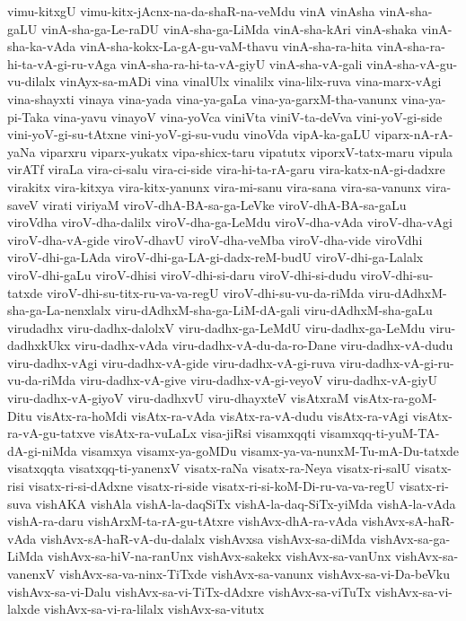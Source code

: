 {vimu-kitxgU
vimu-kitx-jAcnx-na-da-shaR-na-veMdu
vinA
vinAsha
vinA-sha-gaLU
vinA-sha-ga-Le-raDU
vinA-sha-ga-LiMda
vinA-sha-kAri
vinA-shaka
vinA-sha-ka-vAda
vinA-sha-kokx-La-gA-gu-vaM-thavu
vinA-sha-ra-hita
vinA-sha-ra-hi-ta-vA-gi-ru-vAga
vinA-sha-ra-hi-ta-vA-giyU
vinA-sha-vA-gali
vinA-sha-vA-gu-vu-dilalx
vinAyx-sa-mADi
vina
vinalUlx
vinalilx
vina-lilx-ruva
vina-marx-vAgi
vina-shayxti
vinaya
vina-yada
vina-ya-gaLa
vina-ya-garxM-tha-vanunx
vina-ya-pi-Taka
vina-yavu
vinayoV
vina-yoVca
viniVta
viniV-ta-deVva
vini-yoV-gi-side
vini-yoV-gi-su-tAtxne
vini-yoV-gi-su-vudu
vinoVda
vipA-ka-gaLU
viparx-nA-rA-yaNa
viparxru
viparx-yukatx
vipa-shicx-taru
vipatutx
viporxV-tatx-maru
vipula
virATf
viraLa
vira-ci-salu
vira-ci-side
vira-hi-ta-rA-garu
vira-katx-nA-gi-dadxre
virakitx
vira-kitxya
vira-kitx-yanunx
vira-mi-sanu
vira-sana
vira-sa-vanunx
vira-saveV
virati
viriyaM
viroV-dhA-BA-sa-ga-LeVke
viroV-dhA-BA-sa-gaLu
viroVdha
viroV-dha-dalilx
viroV-dha-ga-LeMdu
viroV-dha-vAda
viroV-dha-vAgi
viroV-dha-vA-gide
viroV-dhavU
viroV-dha-veMba
viroV-dha-vide
viroVdhi
viroV-dhi-ga-LAda
viroV-dhi-ga-LA-gi-dadx-reM-budU
viroV-dhi-ga-Lalalx
viroV-dhi-gaLu
viroV-dhisi
viroV-dhi-si-daru
viroV-dhi-si-dudu
viroV-dhi-su-tatxde
viroV-dhi-su-titx-ru-va-va-regU
viroV-dhi-su-vu-da-riMda
viru-dAdhxM-sha-ga-La-nenxlalx
viru-dAdhxM-sha-ga-LiM-dA-gali
viru-dAdhxM-sha-gaLu
virudadhx
viru-dadhx-dalolxV
viru-dadhx-ga-LeMdU
viru-dadhx-ga-LeMdu
viru-dadhxkUkx
viru-dadhx-vAda
viru-dadhx-vA-du-da-ro-Dane
viru-dadhx-vA-dudu
viru-dadhx-vAgi
viru-dadhx-vA-gide
viru-dadhx-vA-gi-ruva
viru-dadhx-vA-gi-ru-vu-da-riMda
viru-dadhx-vA-give
viru-dadhx-vA-gi-veyoV
viru-dadhx-vA-giyU
viru-dadhx-vA-giyoV
viru-dadhxvU
viru-dhayxteV
visAtxraM
visAtx-ra-goM-Ditu
visAtx-ra-hoMdi
visAtx-ra-vAda
visAtx-ra-vA-dudu
visAtx-ra-vAgi
visAtx-ra-vA-gu-tatxve
visAtx-ra-vuLaLx
visa-jiRsi
visamxqqti
visamxqq-ti-yuM-TA-dA-gi-niMda
visamxya
visamx-ya-goMDu
visamx-ya-va-nunxM-Tu-mA-Du-tatxde
visatxqqta
visatxqq-ti-yanenxV
visatx-raNa
visatx-ra-Neya
visatx-ri-salU
visatx-risi
visatx-ri-si-dAdxne
visatx-ri-side
visatx-ri-si-koM-Di-ru-va-va-regU
visatx-ri-suva
vishAKA
vishAla
vishA-la-daqSiTx
vishA-la-daq-SiTx-yiMda
vishA-la-vAda
vishA-ra-daru
vishArxM-ta-rA-gu-tAtxre
vishAvx-dhA-ra-vAda
vishAvx-sA-haR-vAda
vishAvx-sA-haR-vA-du-dalalx
vishAvxsa
vishAvx-sa-diMda
vishAvx-sa-ga-LiMda
vishAvx-sa-hiV-na-ranUnx
vishAvx-sakekx
vishAvx-sa-vanUnx
vishAvx-sa-vanenxV
vishAvx-sa-va-ninx-TiTxde
vishAvx-sa-vanunx
vishAvx-sa-vi-Da-beVku
vishAvx-sa-vi-Dalu
vishAvx-sa-vi-TiTx-dAdxre
vishAvx-sa-viTuTx
vishAvx-sa-vi-lalxde
vishAvx-sa-vi-ra-lilalx
vishAvx-sa-vitutx
}
